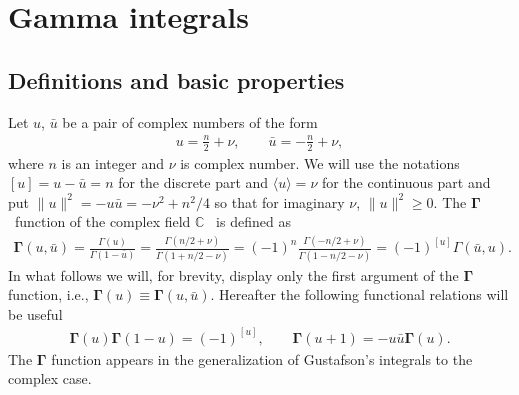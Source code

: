 \section{ Gamma integrals}\label{sect:two}

\subsection{Definitions and basic properties}\label{subsec:def}

Let $u$, $\bar u$ be a pair of complex numbers of the form
\begin{gather}\label{def:z}
u=\frac n2+\nu, \qquad \bar u=-\frac n2+\nu,
\end{gather}
where $n$ is an integer and $\nu$ is complex number. We will use the notations $[u] = u-\bar u=n$ for the discrete
part and $\langle u \rangle = \nu$ for the continuous part and put $\|u\|^2=-u\bar u= -\nu^2+n^2/4$ so that for
imaginary $\nu$, $\|u\|^2\geq 0$. The $\boldsymbol \Gamma$~function of the complex field $\mathbb C$~\cite{GelfandGraevRetakh04} is defined as
\begin{gather*}
{\boldsymbol{\Gamma}}(u,\bar u)=\frac{\Gamma(u)}{\Gamma(1-\bar u)}
=\frac{\Gamma(n/2+\nu)}{\Gamma(1+n/2-\nu)}=(-1)^n\frac{\Gamma(-n/2+\nu)}{\Gamma(1-n/2-\nu)} =(-1)^{[u]}\Gamma(\bar u, u).
\end{gather*}
In what follows we will, for brevity, display only the first argument of the $\boldsymbol \Gamma$ function, i.e.,
$\boldsymbol \Gamma(u)\equiv \boldsymbol \Gamma(u,\bar u)$. Hereafter the following functional relations will be useful
\begin{gather}\label{func:gamma}
\boldsymbol \Gamma(u)\boldsymbol \Gamma(1-u)=(-1)^{[u]}, \qquad
\boldsymbol \Gamma(u+1)=-u\bar u \boldsymbol \Gamma(u).
\end{gather}
The $\boldsymbol \Gamma$ function appears in the generalization of Gustafson's integrals to the complex case.

